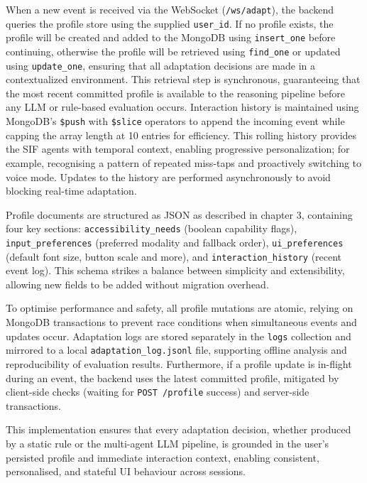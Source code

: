 \documentclass[openany]{book}
\begin{document}
When a new event is received via the WebSocket (\texttt{/ws/adapt}), the backend queries the profile store using the supplied \texttt{user\_id}. If no profile exists, the profile will be created and added to the MongoDB using \texttt{insert\_one} before continuing, otherwise the profile will be retrieved using \texttt{find\_one} or updated using \texttt{update\_one}, ensuring that all adaptation decisions are made in a contextualized environment. This retrieval step is synchronous, guaranteeing that the most recent committed profile is available to the reasoning pipeline before any LLM or rule-based evaluation occurs. Interaction history is maintained using MongoDB’s \texttt{\$push} with \texttt{\$slice} operators to append the incoming event while capping the array length at 10 entries for efficiency. This rolling history provides the SIF agents with temporal context, enabling progressive personalization; for example, recognising a pattern of repeated miss-taps and proactively switching to voice mode. Updates to the history are performed asynchronously to avoid blocking real-time adaptation.

Profile documents are structured as JSON as described in chapter 3, containing four key sections: \texttt{accessibility\_needs} (boolean capability flags), \texttt{input\_preferences} (preferred modality and fallback order), \texttt{ui\_preferences} (default font size, button scale and more), and \texttt{interaction\_history} (recent event log). This schema strikes a balance between simplicity and extensibility, allowing new fields to be added without migration overhead.

To optimise performance and safety, all profile mutations are atomic, relying on MongoDB transactions to prevent race conditions when simultaneous events and updates occur. Adaptation logs are stored separately in the \texttt{logs} collection and mirrored to a local \texttt{adaptation\_log.jsonl} file, supporting offline analysis and reproducibility of evaluation results. Furthermore, if a profile update is in-flight during an event, the backend uses the latest committed profile, mitigated by client-side checks (waiting for \texttt{POST /profile} success) and server-side transactions.

This implementation ensures that every adaptation decision, whether produced by a static rule or the multi-agent LLM pipeline, is grounded in the user’s persisted profile and immediate interaction context, enabling consistent, personalised, and stateful UI behaviour across sessions.
\end{document}
